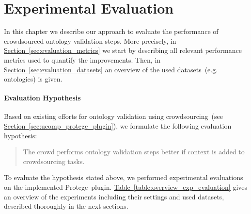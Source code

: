 \chapter{Experimental Evaluation}
In this chapter we describe our approach to evaluate the performance of crowdsourced ontology validation steps. More precisely, in \hyperref[sec:evaluation_metrics]{Section~\ref*{sec:evaluation_metrics}} we start by describing all relevant performance metrics used to quantify the improvements. Then, in \hyperref[sec:evaluation_datasets]{Section~\ref*{sec:evaluation_datasets}} an overview of the used datasets~(e.g. ontologies) is given. 

\subsubsection{Evaluation Hypothesis}
Based on existing efforts for ontology validation using crowdsourcing~(see \hyperref[sec:ucomp_protege_plugin]{Section~\ref*{sec:ucomp_protege_plugin}}), we formulate the following evaluation hypothesis:
\begin{quotation}
	The crowd performs ontology validation steps better if context is added to crowdsourcing tasks.
\end{quotation}

To evaluate the hypothesis stated above, we performed experimental evaluations on the implemented Protege~plugin. \hyperref[table:overview_exp_evaluation]{Table~\ref*{table:overview_exp_evaluation}} gives an overview of the experiments including their settings and used datasets, described thoroughly in the next sections. 






